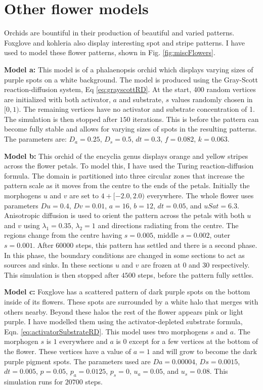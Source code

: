 \section{Other flower models}
Orchids are bountiful in their production of beautiful and varied patterns. Foxglove and kohleria also display interesting spot and stripe patterns. I have used \ProgramName{} to model these flower patterns, shown in Fig. \ref{fig:miscFlowers}.

\textbf{Model a:} 
This model is of a phalaenopsis orchid which displays varying sizes of purple spots on a white background. The model is produced using the Gray-Scott reaction-diffusion system, Eq \ref{eq:grayscottRD}. At the start, 400 random vertices are initialized with both activator, $a$ and substrate, $s$ values randomly chosen in $[0, 1)$. The remaining vertices have no activator and substrate concentration of 1. The simulation is then stopped after $150$ iterations. This is before the pattern can become fully stable and allows for varying sizes of spots in the resulting patterns. The parameters are: $D_a = 0.25$, $D_s = 0.5$, $dt = 0.3$, $f = 0.082$, $k = 0.063$.

\textbf{Model b:}
This orchid of the encyclia genus displays orange and yellow stripes across the flower petals. To model this, I have used the Turing reaction-diffusion formula. The domain is partitioned into three circular zones that increase the pattern scale as it moves from the centre to the ends of the petals. Initially the morphogens $u$ and $v$ are set to $4 + [-2.0, 2.0)$ everywhere. The whole flower uses parameters $Du=0.4$, $Dv=0.01$, $a=16$, $b=12$, $dt=0.05$, and $uSat=6.3$. Anisotropic diffusion is used to orient the pattern across the petals with both $u$ and $v$ using $\lambda_1=0.35$, $\lambda_2=1$ and directions radiating from the centre. The regions change from the centre having $s=0.005$, middle $s=0.002$, outer $s=0.001$. After $60000$ steps, this pattern has settled and there is a second phase. In this phase, the boundary conditions are changed in some sections to act as sources and sinks. In these sections $u$ and $v$ are frozen at $0$ and $30$ respectively. This simulation is then stopped after $4500$ steps, before the pattern fully settles.

\textbf{Model c:}
Foxglove has a scattered pattern of dark purple spots on the bottom inside of its flowers. These spots are surrounded by a white halo that merges with others nearby. Beyond these halos the rest of the flower appears pink or light purple. I have modelled them using the activator-depleted substrate formula, Eqn. \ref{eq:activatorSubstrateRD}. This model uses two morphogens $s$ and $a$. The morphogen $s$ is $1$ everywhere and $a$ is $0$ except for a few vertices at the bottom of the flower. These vertices have a value of $a=1$ and will grow to become the dark purple pigment spots. The parameters used are $Da=0.00004$, $Ds=0.0015$, $dt=0.005$, $p=0.05$, $p_a=0.0125$, $p_s=0$, $u_a=0.05$, and $u_s=0.08$. This simulation runs for $20700$ steps.

